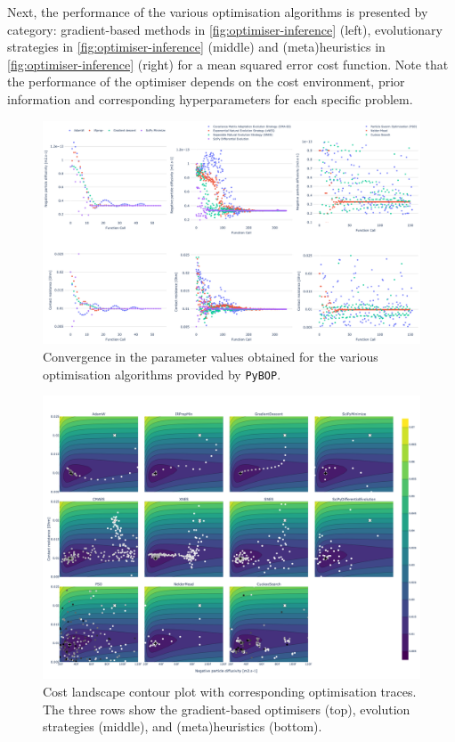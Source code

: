 \documentclass[
]{article}
\begin{document}
Next, the performance of the various optimisation algorithms is
presented by category: gradient-based methods in
\autoref{fig:optimiser-inference} (left), evolutionary strategies in
\autoref{fig:optimiser-inference} (middle) and (meta)heuristics in
\autoref{fig:optimiser-inference} (right) for a mean squared error cost
function. Note that the performance of the optimiser depends on the cost
environment, prior information and corresponding hyperparameters for
each specific problem.

\begin{figure}
\centering
\includegraphics[width=1\textwidth,height=\textheight]{figures/joss/optimisers_parameters.png}
\caption{Convergence in the parameter values obtained for the various
optimisation algorithms provided by \texttt{PyBOP}.
\label{fig:optimiser-inference}}
\end{figure}

\begin{figure}
\centering
\includegraphics[width=1\textwidth,height=\textheight]{figures/joss/contour_subplot.png}
\caption{Cost landscape contour plot with corresponding optimisation
traces. The three rows show the gradient-based optimisers (top),
evolution strategies (middle), and (meta)heuristics (bottom).
\label{fig:optimiser-inference}}
\end{figure}
\end{document}
